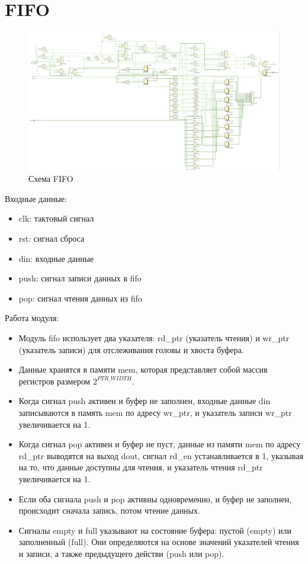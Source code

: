 \documentclass[12pt,onecolumn]{article}
\begin{document}
\section{FIFO}
\begin{figure}[H]
  \centering
  \includegraphics[width=\textwidth]{image/fifo.png}
  \caption{Схема FIFO}
\end{figure}
Входные данные:
\begin{itemize}
    \item clk: тактовый сигнал
    \item rst: сигнал сброса
    \item din: входные данные
    \item push: сигнал записи данных в fifo
    \item pop: сигнал чтения данных из fifo
\end{itemize}
Работа модуля:
\begin{itemize}
    \item Модуль fifo использует два указателя: rd\_ptr (указатель чтения) и wr\_ptr (указатель записи) для отслеживания головы и хвоста буфера.
    \item Данные хранятся в памяти mem, которая представляет собой массив регистров размером $2^{PTR\_WIDTH}$.
    \item Когда сигнал push активен и буфер не заполнен, входные данные din записываются в память mem по адресу wr\_ptr, и указатель записи wr\_ptr увеличивается на 1.
    \item Когда сигнал pop активен и буфер не пуст, данные из памяти mem по адресу rd\_ptr выводятся на выход dout, сигнал rd\_en устанавливается в 1, указывая на то, что данные доступны для чтения, и указатель чтения rd\_ptr увеличивается на 1.
    \item Если оба сигнала push и pop активны одновременно, и буфер не заполнен, происходит сначала запись, потом чтение данных.
    \item Сигналы empty и full указывают на состояние буфера: пустой (empty) или заполненный (full). Они определяются на основе значений указателей чтения и записи, а также предыдущего действи (push или pop).
\end{itemize}
\end{document}
